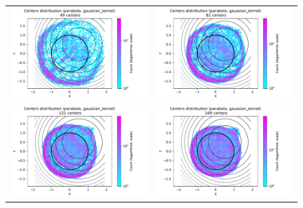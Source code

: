 \documentclass[12pt]{report} %
\begin{document}
\begin{figure}[h]
  \hspace*{-2cm}
  \begin{tabular}{cc}
    \includegraphics[width=.6\textwidth]{imagenes/experiments/2d/statistical_2d_full_scheduler_interpolation/parabola/circle_c49_parabola_gaussian_kernel.pdf}  &
    \includegraphics[width=.6\textwidth]{imagenes/experiments/2d/statistical_2d_full_scheduler_interpolation/parabola/circle_c81_parabola_gaussian_kernel.pdf}    \\
    \includegraphics[width=.6\textwidth]{imagenes/experiments/2d/statistical_2d_full_scheduler_interpolation/parabola/circle_c121_parabola_gaussian_kernel.pdf} &
    \includegraphics[width=.6\textwidth]{imagenes/experiments/2d/statistical_2d_full_scheduler_interpolation/parabola/circle_c169_parabola_gaussian_kernel.pdf}   \\

\end{tabular}
\end{figure}
\end{document}

